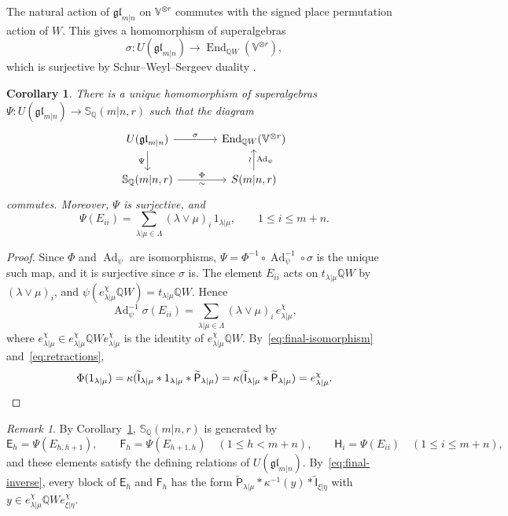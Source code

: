 \documentclass[11pt,a4paper]{amsart}
\newtheorem{corollary}[theorem]{Corollary}
\theoremstyle{definition}
\theoremstyle{remark}
\newtheorem{remark}[theorem]{Remark}
\newcommand{\Q}{\mathbb Q}
\newcommand{\bS}{\mathbb S}
\newcommand{\End}{\operatorname{End}}
\newcommand{\Ad}{\operatorname{Ad}}
\newcommand{\lm}{\lambda|\mu}
\newcommand{\xh}{\xi|\eta}
\numberwithin{equation}{section}
\begin{document}
The natural action of $\mathfrak{gl}_{m|n}$ on $\mathbb V^{\otimes r}$
commutes with the signed place permutation action of $W$. This gives a
homomorphism of superalgebras
$$
\sigma:U(\mathfrak{gl}_{m|n})\longrightarrow\End_{\Q W}(\mathbb V^{\otimes r}),
$$
which is surjective by Schur--Weyl--Sergeev duality \cite{Ser,BR}.

\begin{corollary}\label{cor:surjection}
There is a unique homomorphism of superalgebras
$\Psi:U(\mathfrak{gl}_{m|n})\to\bS_\Q(m|n,r)$ such that the diagram
$$
\begin{tikzcd}[column sep=large]
U(\mathfrak{gl}_{m|n}) \arrow[r,"\sigma"] \arrow[d,"\Psi"'] &
\End_{\Q W}(\mathbb V^{\otimes r}) \\
\bS_\Q(m|n,r) \arrow[r,"\Phi","\sim"'] &
S(m|n,r) \arrow[u,"\Ad_\psi"',"\wr"]
\end{tikzcd}
$$
commutes. Moreover, $\Psi$ is surjective, and
$$
\Psi(E_{ii})=\sum_{\lm\in\Lambda}(\lambda\vee\mu)_i\,1_{\lm},
\qquad 1\le i\le m+n.
$$
\end{corollary}
\begin{proof}
Since $\Phi$ and $\Ad_\psi$ are isomorphisms,
$\Psi=\Phi^{-1}\circ\Ad_\psi^{-1}\circ\sigma$ is the unique such map, and it
is surjective since $\sigma$ is. The element $E_{ii}$ acts on
$t_{\lm}\Q W$ by $(\lambda\vee\mu)_i$, and
$\psi(e_{\lm}^\chi\Q W)=t_{\lm}\Q W$. Hence
$$
\Ad_\psi^{-1}\sigma(E_{ii})=\sum_{\lm\in\Lambda}(\lambda\vee\mu)_i\,e_{\lm}^\chi,
$$
where $e_{\lm}^\chi\in e_{\lm}^\chi\Q We_{\lm}^\chi$ is the identity of
$e_{\lm}^\chi\Q W$. By~\eqref{eq:final-isomorphism}
and~\eqref{eq:retractions},
$$
\Phi(1_{\lm})=\kappa(\widetilde{\mathsf I}_{\lm}*1_{\lm}*\widetilde{\mathsf P}_{\lm})=\kappa(\widetilde{\mathsf I}_{\lm}*\widetilde{\mathsf P}_{\lm})
=e_{\lm}^\chi .\qedhere
$$
\end{proof}

\begin{remark}\label{rem:chevalley}
By Corollary~\ref{cor:surjection}, $\bS_\Q(m|n,r)$ is generated by
$$
\mathsf E_h=\Psi(E_{h,h+1}),\qquad
\mathsf F_h=\Psi(E_{h+1,h})\quad(1\le h<m+n),\qquad
\mathsf H_i=\Psi(E_{ii})\quad(1\le i\le m+n),
$$
and these elements satisfy the defining relations of
$U(\mathfrak{gl}_{m|n})$. By~\eqref{eq:final-inverse}, every block of
$\mathsf E_h$ and $\mathsf F_h$ has the form
$\widetilde{\mathsf P}_{\lm}*\kappa^{-1}(y)*\widetilde{\mathsf I}_{\xh}$ with
$y\in e_{\lm}^\chi\Q We_{\xh}^\chi$.
\end{remark}
\end{document}
